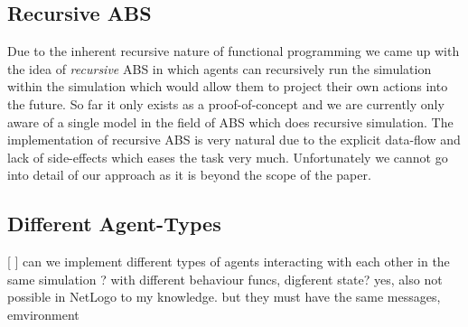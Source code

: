 \subsection{Recursive ABS}
Due to the inherent recursive nature of functional programming we came up with the idea of \textit{recursive} ABS in which agents can recursively run the simulation within the simulation which would allow them to project their own actions into the future. So far it only exists as a proof-of-concept and we are currently only aware of a single model \cite{gilmer_recursive_2000} in the field of ABS which does recursive simulation. The implementation of recursive ABS is very natural due to the explicit data-flow and lack of side-effects which eases the task very much. Unfortunately we cannot go into detail of our approach as it is beyond the scope of the paper.


\subsection{Different Agent-Types}
[ ] can we implement different types of agents interacting with each other in the same simulation ? with different behaviour funcs, digferent state? yes, also not possible in NetLogo to my knowledge. but they must have the same messages, emvironment 


